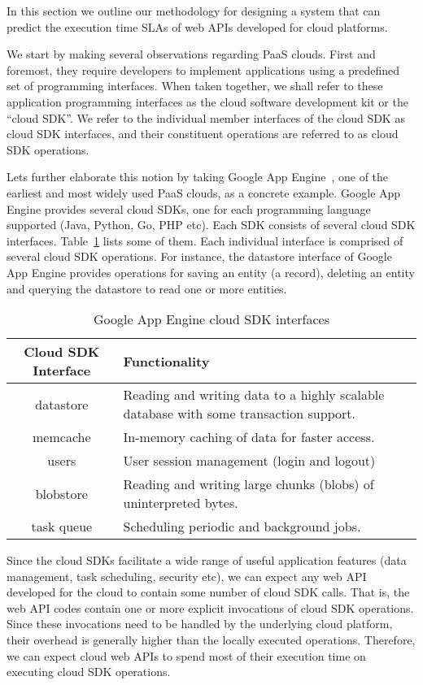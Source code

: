 In this section we outline our methodology for designing a system that can predict the execution
time SLAs of web APIs developed for cloud platforms.

We start by making several observations regarding PaaS clouds. First and foremost, 
they require developers
to implement applications using a predefined set of programming interfaces. When taken 
together, we shall refer to these application programming interfaces as the cloud software development 
kit or the ``cloud SDK''. We refer to the individual member interfaces of the cloud SDK
as cloud SDK interfaces, and their constituent operations are referred to as cloud SDK operations.

Lets further elaborate this notion by taking Google App Engine~\cite{gae}, one of the earliest and most widely
used PaaS clouds, as a concrete example. Google App Engine provides several cloud SDKs, one for each
programming language supported (Java, Python, Go, PHP etc). Each SDK consists of
several cloud SDK interfaces. Table~\ref{tab:gae_cloud_sdk} lists some of them.
Each individual interface is comprised of several cloud SDK operations. For instance, the 
datastore interface of Google App Engine provides operations for saving an entity (a record),
deleting an entity and querying the datastore to read one or more entities.

\begin{table}[htdp]
\caption{Google App Engine cloud SDK interfaces}
\begin{center}
\begin{tabular}{|c|p{5cm}|}
\hline
Cloud SDK Interface & Functionality \\ \hline
datastore & Reading and writing data to a highly scalable database with some transaction support. \\ \hline
memcache & In-memory caching of data for faster access.\\ \hline
users & User session management (login and logout)\\ \hline
blobstore & Reading and writing large chunks (blobs) of uninterpreted bytes.\\ \hline
task queue & Scheduling periodic and background jobs.\\ \hline
\end{tabular}
\end{center}
\label{tab:gae_cloud_sdk}
\end{table}

Since the cloud SDKs facilitate a wide range of useful application features (data management, 
task scheduling, security etc), we can expect any web API developed for the cloud to
contain some number of cloud SDK calls. That is, the web API codes contain one or more
explicit invocations of cloud SDK operations. Since these invocations need to be handled by the
underlying cloud platform, their overhead is generally higher than the locally executed operations.
Therefore, we can expect cloud web APIs to spend most of their execution time on executing cloud
SDK operations. 

